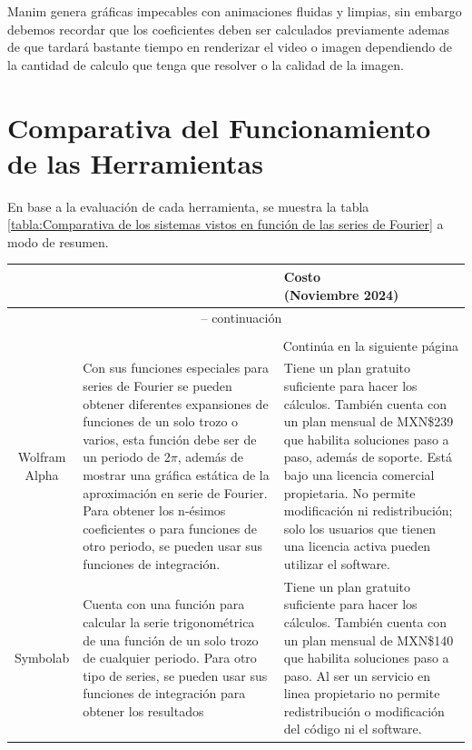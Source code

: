 Manim genera gráficas impecables con animaciones fluidas y limpias, sin embargo debemos recordar que los coeficientes deben ser calculados previamente ademas de que tardará bastante tiempo en renderizar el video o imagen dependiendo de la cantidad de calculo que tenga que resolver o la calidad de la imagen.
\section{Comparativa del Funcionamiento de las Herramientas}
En base a la evaluación de cada herramienta, se muestra la tabla \ref{tabla:Comparativa de los sistemas vistos en función de las series de Fourier} a modo de resumen.
\begin{longtable}{ | c | m{6.5cm} | m{4.5cm} | }
	\rowcolor{black!75}
	\head {Herramienta} & \head {Resumen del Funcionamiento} & \head {Costo \newline (Noviembre 2024)} \\ \hline
	\endfirsthead
	\multicolumn{3}{c}{{\tablename\ \thetable{} -- continuación}} \\
	\rowcolor{black!75}
	\head {SOFTWARE} & \head {Resumen del Funcionamiento} & \head {PRECIO} \\ \hline
	\endhead
	\hline \multicolumn{3}{r}{{Continúa en la siguiente página}} \\
	\endfoot
	\hline
	\endlastfoot
	Wolfram Alpha & Con sus funciones especiales para series de Fourier se pueden obtener diferentes expansiones de funciones de un solo trozo o varios, esta función debe ser de un periodo de 2$\pi$, además de mostrar una gráfica estática de la aproximación en serie de Fourier. Para obtener los n-ésimos coeficientes o para funciones de otro periodo, se pueden usar sus funciones de integración.  & Tiene un plan gratuito suficiente para hacer los cálculos. También cuenta con un plan mensual de MXN\$239 que habilita soluciones paso a paso, además de soporte. Está bajo una licencia comercial propietaria. No permite modificación ni redistribución; solo los usuarios que tienen una licencia activa pueden utilizar el software. \\ \hline
	
	Symbolab & Cuenta con una función para calcular la serie trigonométrica de una función de un solo trozo de cualquier periodo. Para otro tipo de series, se pueden usar sus funciones de integración para obtener los resultados & Tiene un plan gratuito suficiente para hacer los cálculos. También cuenta con un plan mensual de MXN\$140 que habilita soluciones paso a paso. Al ser un servicio en linea propietario no permite redistribución o modificación del código ni el software.
	\\ \hline
	

\end{longtable}
